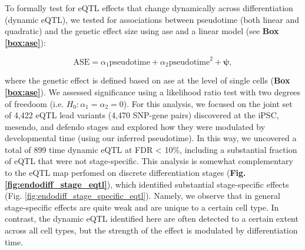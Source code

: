 To formally test for eQTL effects that change dynamically across differentiation (dynamic eQTL), we tested for associations between pseudotime (both linear and quadratic) and the genetic effect size using \gls{ase} and a linear model (see \textbf{Box \ref{box:ase}}):

\begin{equation}\label{eq:endodiff_ase_pseudotime}
    \mathrm{ASE} = \alpha_1 \mathrm{pseudotime} + \alpha_2 \mathrm{pseudotime}^2 + \boldsymbol{\psi},
\end{equation}

where the genetic effect is defined based on \gls{ase} at the level of single cells (\textbf{Box \ref{box:ase}}).
We assessed significance using a likelihood ratio test with two degrees of freedoom (i.e. $H_0: \alpha_1 = \alpha_2 = 0$). 
For this analysis, we focused on the joint set of 4,422 eQTL lead variants (4,470 SNP-gene pairs) discovered at the iPSC, mesendo, and defendo stages and explored how they were modulated by developmental time (using our inferred pseudotime).
In this way, we uncovered a total of 899 time dynamic eQTL at FDR < 10\%, including a substantial fraction of eQTL that were not stage-specific.
This analysis is somewhat complementary to the eQTL map perfomed on discrete differentiation stages (\textbf{Fig. \ref{fig:endodiff_stage_eqtl}}), which identified substantial stage-specific effects (Fig. \ref{fig:endodiff_stage_specific_eqtl}).
Namely, we observe that in general stage-specific effects are quite weak and are unique to a certain cell type.
In contrast, the dynamic eQTL identified here are often detected to a certain extent across all cell types, but the strength of the effect is modulated by differentiation time. \\


